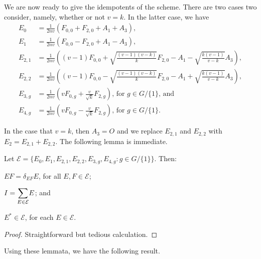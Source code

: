 \documentclass[../../../main]{subfiles}
\begin{document}
We are now ready to give the idempotents of the scheme. There are two cases two consider, namely, whether or not $v=k$. In the latter case, we have
\begin{align*}
 E_0 &= \frac{1}{2nv}(F_{0,0} + F_{2,0} + A_1 + A_3), \\
 E_1 &= \frac{1}{2nv}\left( F_{0,0} - F_{2,0} + A_1 - A_3 \right), \\
 E_{2,1} &= \frac{1}{2nv}\left( (v-1)F_{0,0} + \sqrt{\frac{(v-1)(v-k)}{k}}F_{2,0} - A_1 - \sqrt{\frac{k(v-1)}{v-k}}A_3 \right), \\
 E_{2,2} &= \frac{1}{2nv}\left( (v-1)F_{0,0} - \sqrt{\frac{(v-1)(v-k)}{k}}F_{2,0} - A_1 + \sqrt{\frac{k(v-1)}{v-k}}A_3 \right), \\
 E_{3,g} &= \frac{1}{2nv}\left( vF_{0,g} + \frac{v}{\sqrt{k}}F_{2,g} \right) \text{, for $g \in G/\{1\}$, and} \\
 E_{4,g} &= \frac{1}{2nv}\left( vF_{0,g} - \frac{v}{\sqrt{k}}F_{2,g} \right) \text{, for $g \in G/\{1\}$.}
\end{align*}

In the case that $v=k$, then $A_3=O$ and we replace $E_{2,1}$ and $E_{2,2}$ with $E_2 = E_{2,1}+E_{2,2}$. The following lemma is immediate.

\begin{lem}
 Let $\mathcal{E} = \{E_0,E_1,E_{2,1},E_{2,2},E_{3,g},E_{4,g} : g \in G/\{1\}\}$. Then:
 \begin{defenum}
  \item $EF=\delta_{EF}E$, for all $E,F \in \mathcal{E}$;
  \item $I=\ssum_{E \in \mathcal{E}}E$; and
  \item $E^* \in \mathcal{E}$, for each $E \in \mathcal{E}$.
 \end{defenum}
\end{lem}

\begin{proof}
 Straightforward but tedious calculation.
\end{proof}

Using these lemmata, we have the following result.
\end{document}
